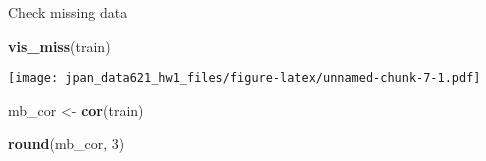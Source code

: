 \documentclass[]{article}
\newenvironment{Shaded}{\begin{snugshade}}{\end{snugshade}}
\newcommand{\KeywordTok}[1]{\textcolor[rgb]{0.13,0.29,0.53}{\textbf{#1}}}
\newcommand{\DecValTok}[1]{\textcolor[rgb]{0.00,0.00,0.81}{#1}}
\newcommand{\StringTok}[1]{\textcolor[rgb]{0.31,0.60,0.02}{#1}}
\newcommand{\NormalTok}[1]{#1}
\begin{document}
Check missing data

\begin{Shaded}
\begin{Highlighting}[]
\KeywordTok{vis_miss}\NormalTok{(train)}
\end{Highlighting}
\end{Shaded}

\texttt{[image: jpan\_data621\_hw1\_files/figure-latex/unnamed-chunk-7-1.pdf]}

\begin{Shaded}
\begin{Highlighting}[]
\NormalTok{mb_cor <-}\StringTok{ }\KeywordTok{cor}\NormalTok{(train)}

\KeywordTok{round}\NormalTok{(mb_cor, }\DecValTok{3}\NormalTok{)}
\end{Highlighting}
\end{Shaded}
\end{document}
